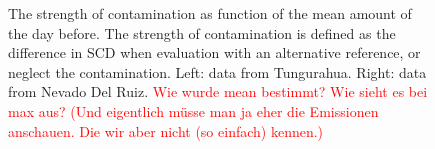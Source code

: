 \begin{figure}
	\caption{The strength of contamination as function of the mean  amount of the day before. The strength of contamination is defined as the difference in  SCD  when evaluation with an alternative reference, or neglect the contamination. Left: data from Tungurahua. Right: data from Nevado Del Ruiz. \textcolor{red}{Wie wurde mean  bestimmt? Wie sieht es bei max  aus? (Und eigentlich müsse man ja eher die  Emissionen anschauen. Die wir aber nicht (so einfach) kennen.)}}
	\label{fig:contaminationdependencyso2}
\end{figure}